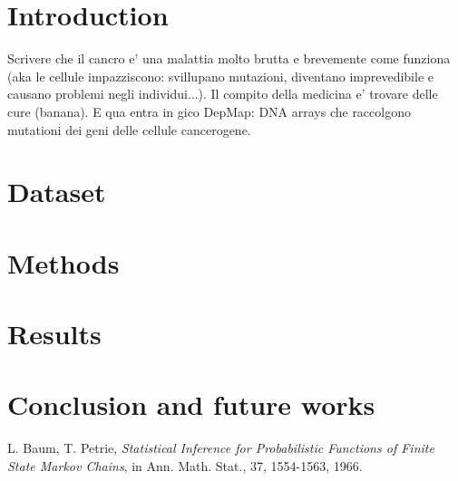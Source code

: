 \documentclass[a4paper,11pt, oneside]{article}  %
\begin{document}
\begin{multicols}{2}
\section{Introduction}
Scrivere che il cancro e' una malattia molto brutta e brevemente come funziona (aka le cellule impazziscono: svillupano mutazioni, diventano imprevedibile e causano problemi negli individui...). Il compito della medicina e' trovare delle cure (banana). E qua entra in gico DepMap: DNA arrays che raccolgono mutationi dei geni delle cellule cancerogene.

\section{Dataset}


\section{Methods}


\section{Results}



\section{Conclusion and future works}


\end{multicols}

\begin{thebibliography}{11}   %
 L. Baum, T. Petrie, \textit{Statistical Inference for Probabilistic Functions of Finite State Markov Chains}, in Ann. Math. Stat., 37, 1554-1563, 1966.
\end{thebibliography}
\end{document}
